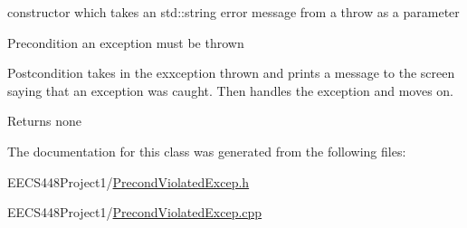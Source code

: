 constructor which takes an std\+::string error message from a throw as a parameter 

\begin{DoxyPrecond}{Precondition}
an exception must be thrown 
\end{DoxyPrecond}
\begin{DoxyPostcond}{Postcondition}
takes in the exxception thrown and prints a message to the screen saying that an exception was caught. Then handles the exception and moves on. 
\end{DoxyPostcond}
\begin{DoxyReturn}{Returns}
none 
\end{DoxyReturn}


The documentation for this class was generated from the following files\+:\begin{DoxyCompactItemize}
\item 
E\+E\+C\+S448\+Project1/\hyperlink{PrecondViolatedExcep_8h}{Precond\+Violated\+Excep.\+h}\item 
E\+E\+C\+S448\+Project1/\hyperlink{PrecondViolatedExcep_8cpp}{Precond\+Violated\+Excep.\+cpp}\end{DoxyCompactItemize}
